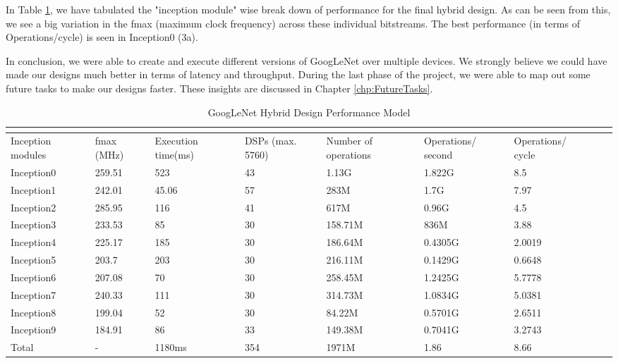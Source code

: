 In Table \ref{tab:GoogLeNetHybridPerfModel12}, we have tabulated the "inception module" wise break down of performance for the final hybrid design. As can be seen from this, we see a big variation in the fmax (maximum clock frequency) across these individual bitstreams. The best performance (in terms of Operations/cycle) is seen in Inception0 (3a). 
  
In conclusion, we were able to create and execute different versions of GoogLeNet over multiple devices. We strongly believe we could have made our designs much better in terms of latency and throughput. During the last phase of the project, we were able to map out some future tasks to make our designs faster. These insights are discussed in Chapter 
\ref{chp:FutureTasks}.
\begin{table}                          
 \centering
  \captionsetup{
 justification = centering
}
\caption{GoogLeNet Hybrid Design Performance Model}
    \begin{tabular}{ | m{5em} | m{1.5cm}| m{2cm} | m{2cm}| m{2cm} | m{2cm}| m{2cm} | m{2.2cm}| m{2.2cm} | }
    \multicolumn{7}{c}{\textbf{}} \\ \hline

     Inception modules    & fmax (MHz) & Execution time(ms) & DSPs (max. 5760) & Number of operations & Operations/ second & Operations/ cycle \\ \hline
      Inception0 &   259.51  &  523 & 43 & 1.13G & 1.822G & 8.5        \\ \hline          
      Inception1    &  242.01 & 45.06 & 57 & 283M & 1.7G & 7.97  \\ \hline
      Inception2   &   285.95 & 116 & 41 & 617M & 0.96G & 4.5\\ \hline
      Inception3 &   233.53   & 85 & 30 & 158.71M & 836M & 3.88\\ \hline
      Inception4 &   225.17 & 185 & 30 & 186.64M & 0.4305G & 2.0019\\ \hline
      Inception5 & 203.7 & 203 & 30 & 216.11M & 0.1429G & 0.6648 \\ \hline
      Inception6 & 207.08 & 70 & 30 & 258.45M & 1.2425G & 5.7778 \\ \hline
      Inception7 & 240.33 & 111 & 30 & 314.73M & 1.0834G & 5.0381 \\ \hline
      Inception8 & 199.04 & 52 & 30 & 84.22M & 0.5701G & 2.6511\\ \hline
      Inception9 & 184.91 & 86 & 33 & 149.38M & 0.7041G & 3.2743\\ \hline
            Total & - & 1180ms & 354 & 1971M & 1.86 & 8.66\\ \hline

    \end{tabular}
    \label{tab:GoogLeNetHybridPerfModel12}                            

\end{table} 





